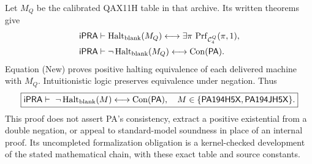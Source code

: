 Let $M_Q$ be the calibrated QAX11H table in that archive.  Its written
theorems give
\begin{align*}
 \mathsf{iPRA}&\vdash\operatorname{Halt}_{\rm blank}(M_Q)
      \longleftrightarrow\exists\pi\,\operatorname{Prf}_{\mathcal C_4^Q}(\pi,1),\\
 \mathsf{iPRA}&\vdash\neg\operatorname{Halt}_{\rm blank}(M_Q)
      \longleftrightarrow\operatorname{Con}(\mathsf{PA}).
\end{align*}
Equation (New) proves positive halting equivalence of each delivered
machine with $M_Q$.  Intuitionistic logic preserves equivalence under
negation.  Thus
\[
 \boxed{\mathsf{iPRA}\vdash\
 \neg\operatorname{Halt}_{\rm blank}(M)\longleftrightarrow\operatorname{Con}(\mathsf{PA}),
 \quad M\in\{\mathsf{PA194H5X},\mathsf{PA194JH5X}\}.}
\]
This proof does not assert PA's consistency, extract a positive
existential from a double negation, or appeal to standard-model soundness
in place of an internal proof.  Its uncompleted formalization obligation
is a kernel-checked development of the stated mathematical chain, with
these exact table and source constants.

